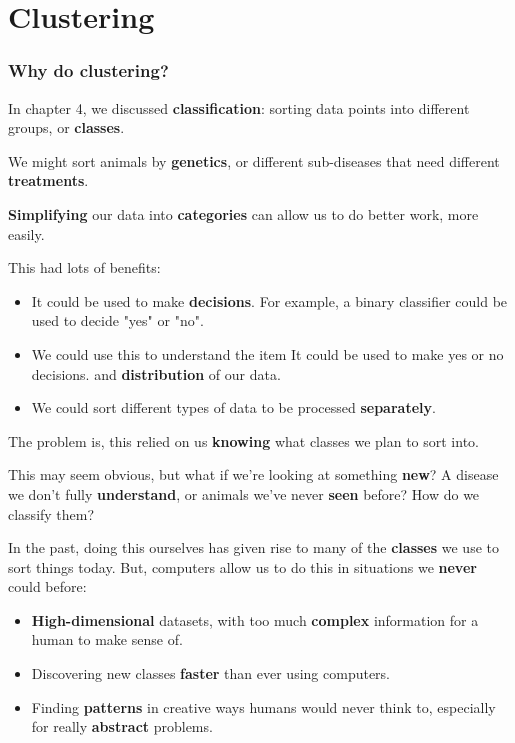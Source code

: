 \setcounter{chapter}{5}

\chapter{Clustering}

    \subsection{Why do clustering?}
    
        In chapter 4, we discussed \textbf{classification}: sorting data points into different groups, or \textbf{classes}. 
        
        \miniex We might sort animals by \textbf{genetics}, or different sub-diseases that need different \textbf{treatments}. 
        
        \textbf{Simplifying} our data into \textbf{categories} can allow us to do better work, more easily.
        
        This had lots of benefits: 
        
        \begin{itemize}
            \item It could be used to make \textbf{decisions}. For example, a binary classifier could be used to decide "yes" or "no". 
        
            \item We could use this to understand the item It could be used to make yes or no decisions. and \textbf{distribution} of our data.
            
            \item We could sort different types of data to be processed \textbf{separately}.
        \end{itemize}
        
        The problem is, this relied on us \textbf{knowing} what classes we plan to sort into. 
        
        This may seem obvious, but what if we're looking at something \textbf{new}? A disease we don't fully \textbf{understand}, or animals we've never \textbf{seen} before? How do we classify them?
        
        In the past, doing this ourselves has given rise to many of the \textbf{classes} we use to sort things today. But, computers allow us to do this in situations we \textbf{never} could before:
        
        \begin{itemize}
            \item \textbf{High-dimensional} datasets, with too much \textbf{complex} information for a human to make sense of.
            
            \item Discovering new classes \textbf{faster} than ever using computers.
            
            \item Finding \textbf{patterns} in creative ways humans would never think to, especially for really \textbf{abstract} problems.\\
        \end{itemize}
    
